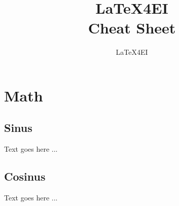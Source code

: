 \documentclass[english]{latex4ei/latex4ei_sheet}
\title{LaTeX4EI \\ Cheat Sheet}
\author{LaTeX4EI}                    %
\begin{document}
\maketitle   %


\section{Math}


\begin{sectionbox}
    \subsection{Sinus}

    Text goes here ...


\end{sectionbox}


\begin{sectionbox}
    \subsection{Cosinus}

    Text goes here ...

\end{sectionbox}

\end{document}
